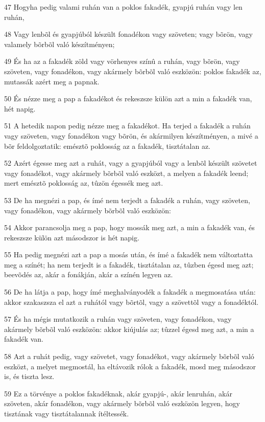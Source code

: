 \par 47 Hogyha pedig valami ruhán van a poklos fakadék, gyapjú ruhán vagy len ruhán,
\par 48 Vagy lenbõl és gyapjúból készült fonadékon vagy szöveten; vagy bõrön, vagy valamely bõrbõl való készítményen;
\par 49 És ha az a fakadék zöld vagy vörhenyes színû a ruhán, vagy bõrön, vagy szöveten, vagy fonadékon, vagy akármely bõrbõl való eszközön: poklos fakadék az, mutassák azért meg a papnak.
\par 50 És nézze meg a pap a fakadékot és rekeszsze külön azt a min a fakadék van, hét napig.
\par 51 A hetedik napon pedig nézze meg a fakadékot. Ha terjed a fakadék a ruhán vagy szöveten, vagy fonadékon vagy bõrön, és akármilyen készítményen, a mivé a bõr feldolgoztatik: emésztõ poklosság az a fakadék, tisztátalan az.
\par 52 Azért égesse meg azt a ruhát, vagy a gyapjúból vagy a lenbõl készült szövetet vagy fonadékot, vagy akármely bõrbõl való eszközt, a melyen a fakadék leend; mert emésztõ poklosság az, tûzön égessék meg azt.
\par 53 De ha megnézi a pap, és ímé nem terjedt a fakadék a ruhán, vagy szöveten, vagy fonadékon, vagy akármely bõrbõl való eszközön:
\par 54 Akkor parancsolja meg a pap, hogy mossák meg azt, a min a fakadék van, és rekeszsze külön azt másodszor is hét napig.
\par 55 Ha pedig megnézi azt a pap a mosás után, és ímé a fakadék nem változtatta meg a színét; ha nem terjedt is a fakadék, tisztátalan az, tûzben égesd meg azt; beevõdés az, akár a fonákján, akár a színén legyen az.
\par 56 De ha látja a pap, hogy ímé meghalványodék a fakadék a megmosatása után: akkor szakaszsza el azt a ruhától vagy bõrtõl, vagy a szövettõl vagy a fonadéktól.
\par 57 És ha mégis mutatkozik a ruhán vagy szöveten, vagy fonadékon, vagy akármely bõrbõl való eszközön: akkor kiújulás az; tûzzel égesd meg azt, a min a fakadék van.
\par 58 Azt a ruhát pedig, vagy szövetet, vagy fonadékot, vagy akármely bõrbõl való eszközt, a melyet megmostál, ha eltávozik rólok a fakadék, mosd meg másodszor is, és tiszta lesz.
\par 59 Ez a törvénye a poklos fakadéknak, akár gyapjú-, akár lenruhán, akár szöveten, akár fonadékon, vagy akármely bõrbõl való eszközön legyen, hogy tisztának vagy tisztátalannak ítéltessék.

